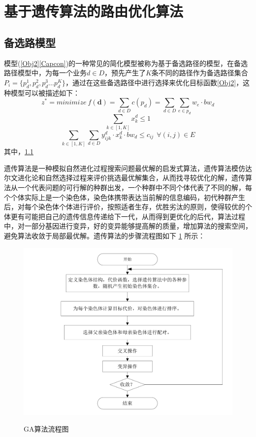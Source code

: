 \section{基于遗传算法的路由优化算法}
\subsection{备选路模型}
模型(\ref{Obj2}\ref{Capcon})的一种常见的简化模型被称为基于备选路径的模型，在备选路径模型中，为每一个业务$d \in D$，预先产生了$K$条不同的路径作为备选路径集合$P_i=\{p^1_d,p^2_d,p^3_d...p^K_d\}$，通过在这些备选路径中进行选择来优化目标函数\ref{Obj2}，这种模型可以被描述如下：
\begin{equation}\label{Obj3}
z^* = minimize~f(\mathbf{d})=
\sum\limits_{d \in D} c(p_d)= \sum\limits_{d \in D}\sum\limits_{e \in p_d} w_e \cdot bw_d
\end{equation}
\begin{equation}\label{Cons1}
\sum\limits_{k \in [1,K]}x_k^d\le1
\end{equation}
\begin{equation}\label{Cons2}
\sum\limits_{k \in [1,K]}\sum\limits_{d \in D} y_{ijk}^d\cdot x_k^d\cdot bw_d\le c_{ij} ~~\forall (i,j)\in E
\end{equation}
其中，\ref{}

遗传算法是一种模拟自然进化过程搜索问题最优解的启发式算法，遗传算法模仿达尔文进化论和自然选择过程来评价挑选最优解集合，从而找寻较优化的解，遗传算法从一个代表问题的可行解的种群出发，一个种群中不同个体代表了不同的解，每个个体实际上是一个染色体，染色体携带表达当前解的信息编码，初代种群产生后，对每个染色体个体进行评价，按照适者生存，优胜劣汰的原则，使得较优的个体更有可能把自己的遗传信息传递给下一代，从而得到更优化的后代，算法过程中，对一部分基因进行变异，好的变异能够提高解的质量，增加算法的搜索空间，避免算法收敛于局部最优解。遗传算法的步骤流程图如下 \ref{IterNum} 所示：
\begin{figure}
\setlength{\belowcaptionskip}{-0.5cm}
\begin{center}
{\includegraphics[width=0.8 \textwidth]{figures/GAprocess.pdf}}
\end{center}
\caption{{\footnotesize{GA算法流程图}}}
\label{IterNum}
\end{figure}
